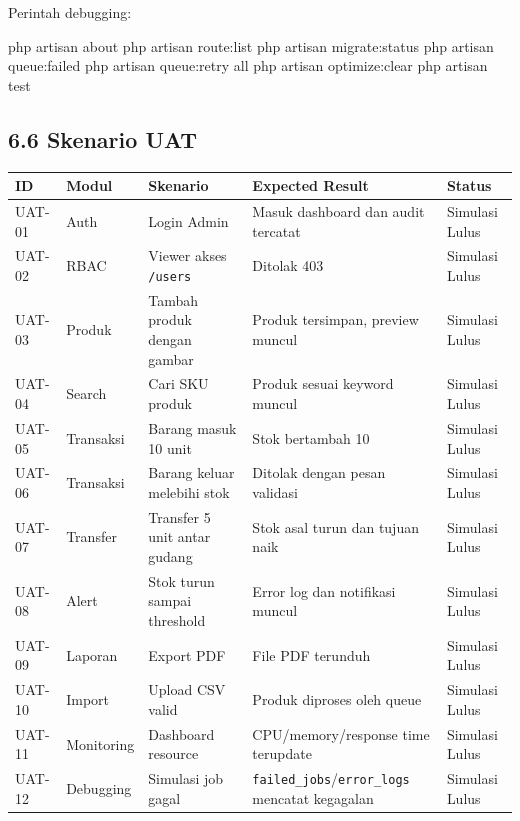 \documentclass[
]{article}
\newenvironment{Shaded}{}{}
\newcommand{\ExtensionTok}[1]{#1}
\newcommand{\NormalTok}[1]{#1}
\begin{document}
Perintah debugging:

\begin{Shaded}
\begin{Highlighting}[]
\ExtensionTok{php}\NormalTok{ artisan about}
\ExtensionTok{php}\NormalTok{ artisan route:list}
\ExtensionTok{php}\NormalTok{ artisan migrate:status}
\ExtensionTok{php}\NormalTok{ artisan queue:failed}
\ExtensionTok{php}\NormalTok{ artisan queue:retry all}
\ExtensionTok{php}\NormalTok{ artisan optimize:clear}
\ExtensionTok{php}\NormalTok{ artisan test}
\end{Highlighting}
\end{Shaded}

\subsection{6.6 Skenario UAT}\label{66-skenario-uat}

\begin{longtable}[]{@{}P{0.10\textwidth}P{0.14\textwidth}P{0.26\textwidth}P{0.30\textwidth}P{0.14\textwidth}@{}}
\toprule\noalign{}
ID & Modul & Skenario & Expected Result & Status \\
\midrule\noalign{}
\endhead
\bottomrule\noalign{}
\endlastfoot
UAT-01 & Auth & Login Admin & Masuk dashboard dan audit tercatat &
Simulasi Lulus \\
UAT-02 & RBAC & Viewer akses \texttt{/users} & Ditolak 403 & Simulasi
Lulus \\
UAT-03 & Produk & Tambah produk dengan gambar & Produk tersimpan,
preview muncul & Simulasi Lulus \\
UAT-04 & Search & Cari SKU produk & Produk sesuai keyword muncul &
Simulasi Lulus \\
UAT-05 & Transaksi & Barang masuk 10 unit & Stok bertambah 10 & Simulasi
Lulus \\
UAT-06 & Transaksi & Barang keluar melebihi stok & Ditolak dengan pesan
validasi & Simulasi Lulus \\
UAT-07 & Transfer & Transfer 5 unit antar gudang & Stok asal turun dan
tujuan naik & Simulasi Lulus \\
UAT-08 & Alert & Stok turun sampai threshold & Error log dan notifikasi
muncul & Simulasi Lulus \\
UAT-09 & Laporan & Export PDF & File PDF terunduh & Simulasi Lulus \\
UAT-10 & Import & Upload CSV valid & Produk diproses oleh queue &
Simulasi Lulus \\
UAT-11 & Monitoring & Dashboard resource & CPU/memory/response time
terupdate & Simulasi Lulus \\
UAT-12 & Debugging & Simulasi job gagal &
\texttt{failed\_jobs}/\texttt{error\_logs} mencatat kegagalan & Simulasi
Lulus \\
\end{longtable}
\end{document}
